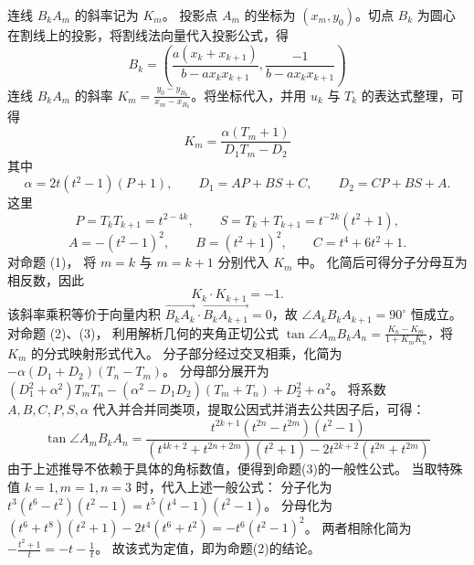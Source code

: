 \begin{solution}
连线 $B_kA_m$ 的斜率记为 $K_m$。
投影点 $A_m$ 的坐标为 $(x_m, y_0)$。切点 $B_k$ 为圆心在割线上的投影，将割线法向量代入投影公式，得
\[ B_k = \left( \frac{a(x_k+x_{k+1})}{b - a x_k x_{k+1}}, \frac{-1}{b - a x_k x_{k+1}} \right) \]
连线 $B_k A_m$ 的斜率 $K_m = \frac{y_0 - y_{B_k}}{x_m - x_{B_k}}$。将坐标代入，并用 $u_k$ 与 $T_k$ 的表达式整理，可得
\[ K_m = \frac{\alpha(T_m+1)}{D_1 T_m - D_2} \]
其中
\[
\alpha = 2t(t^2-1)(P+1),\qquad D_1 = A P + B S + C,\qquad D_2 = C P + B S + A.
\]
这里
\[
P = T_k T_{k+1} = t^{2-4k},\qquad S = T_k + T_{k+1} = t^{-2k}(t^2+1),
\]
\[
A = -(t^2-1)^2,\qquad B = (t^2+1)^2,\qquad C = t^4+6t^2+1.
\]
对命题 (1)，
将 $m=k$ 与 $m=k+1$ 分别代入 $K_m$ 中。
化简后可得分子分母互为相反数，因此
\[
K_k \cdot K_{k+1} = -1.
\]
该斜率乘积等价于向量内积 $\overrightarrow{B_k A_k} \cdot \overrightarrow{B_k A_{k+1}} = 0$，故 $\angle A_k B_k A_{k+1} = 90^\circ$ 恒成立。\\
对命题 (2)、(3)，
利用解析几何的夹角正切公式 $\tan \angle A_m B_k A_n = \frac{K_n - K_m}{1 + K_m K_n}$，将 $K_m$ 的分式映射形式代入。
分子部分经过交叉相乘，化简为 $-\alpha(D_1+D_2)(T_n - T_m)$。
分母部分展开为 $(D_1^2 + \alpha^2) T_m T_n - (\alpha^2 - D_1 D_2)(T_m + T_n) + D_2^2 + \alpha^2$。
将系数 $A, B, C, P, S, \alpha$ 代入并合并同类项，提取公因式并消去公共因子后，可得：
\[ \tan \angle A_m B_k A_n = \frac{t^{2k+1}(t^{2n} - t^{2m})(t^2 - 1)}{(t^{4k+2} + t^{2n+2m})(t^2 + 1) - 2t^{2k+2}(t^{2n} + t^{2m})} \]
由于上述推导不依赖于具体的角标数值，便得到命题(3)的一般性公式。
当取特殊值 $k=1, m=1, n=3$ 时，代入上述一般公式：
分子化为 $t^3 (t^6 - t^2) (t^2-1) = t^5 (t^4-1) (t^2-1)$。
分母化为 $(t^6 + t^8)(t^2+1) - 2t^4(t^6+t^2) = -t^6(t^2-1)^2$。
两者相除化简为 $-\frac{t^2+1}{t} = -t - \frac{1}{t}$。
故该式为定值，即为命题(2)的结论。
\end{solution}



